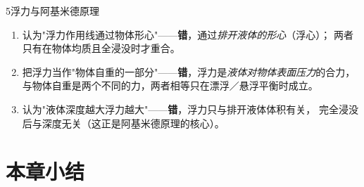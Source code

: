 \begin{kaodian}{5}{浮力与阿基米德原理}
\begin{yicuo}
\begin{enumerate}
\item 认为"浮力作用线通过物体形心"——\textbf{错}，通过\emph{排开液体的形心}（浮心）；
  两者只有在物体均质且全浸没时才重合。\\
\item 把浮力当作"物体自重的一部分"——\textbf{错}，浮力是\emph{液体对物体表面压力}的合力，
  与物体自重是两个不同的力，两者相等只在漂浮／悬浮平衡时成立。\\
\item 认为"液体深度越大浮力越大"——\textbf{错}，浮力只与排开液体体积有关，
  完全浸没后与深度无关（这正是阿基米德原理的核心）。
\end{enumerate}
\end{yicuo}
\end{kaodian}

\section{本章小结}

